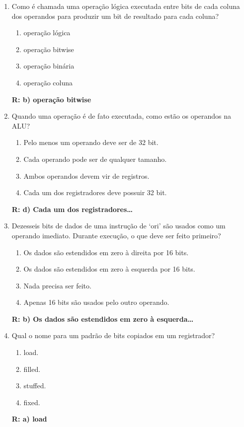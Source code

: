 \documentclass[a4paper,11pt]{article}
\begin{document}
\begin{enumerate}
    \item{Como é chamada uma operação lógica executada entre bits de cada coluna dos operandos para
            produzir um bit de resultado para cada coluna?}
        \begin{enumerate}
            \item{operação lógica}
            \item{operação bitwise}
            \item{operação binária}
            \item{operação coluna}
        \end{enumerate}
        \textbf{R: b) operação bitwise}

    \item{Quando uma operação é de fato executada, como estão os operandos na ALU?}
        \begin{enumerate}
            \item{Pelo menos um operando deve ser de 32 bit.}
            \item{Cada operando pode ser de qualquer tamanho.}
            \item{Ambos operandos devem vir de registros.}
            \item{Cada um dos registradores deve possuir 32 bit.}
        \end{enumerate}
        \textbf{R: d) Cada um dos registradores\dots}

    \item{Dezesseis bits de dados de uma instrução de `ori' são usados como um operando imediato. Durante
            execução, o que deve ser feito primeiro?}
        \begin{enumerate}
            \item{Os dados são estendidos em zero à direita por 16 bits.}
            \item{Os dados são estendidos em zero à esquerda por 16 bits.}
            \item{Nada precisa ser feito.}
            \item{Apenas 16 bits são usados pelo outro operando.}
        \end{enumerate}
        \textbf{R: b) Os dados são estendidos em zero à esquerda\dots}

    \item{Qual o nome para um padrão de bits copiados em um registrador?}
        \begin{enumerate}
            \item{load.}
            \item{filled.}
            \item{stuffed.}
            \item{fixed.}
        \end{enumerate}
        \textbf{R: a) load}


\end{enumerate}
\end{document}
